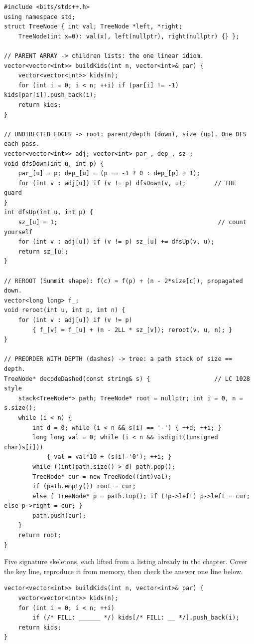 \begin{lstlisting}[caption={Chapter 4 code kit: build, root, and read two formats}, label={lst:c04-kit}]
#include <bits/stdc++.h>
using namespace std;
struct TreeNode { int val; TreeNode *left, *right;
    TreeNode(int x=0): val(x), left(nullptr), right(nullptr) {} };

// PARENT ARRAY -> children lists: the one linear idiom.
vector<vector<int>> buildKids(int n, vector<int>& par) {
    vector<vector<int>> kids(n);
    for (int i = 0; i < n; ++i) if (par[i] != -1) kids[par[i]].push_back(i);
    return kids;
}

// UNDIRECTED EDGES -> root: parent/depth (down), size (up). One DFS each pass.
vector<vector<int>> adj; vector<int> par_, dep_, sz_;
void dfsDown(int u, int p) {
    par_[u] = p; dep_[u] = (p == -1 ? 0 : dep_[p] + 1);
    for (int v : adj[u]) if (v != p) dfsDown(v, u);        // THE guard
}
int dfsUp(int u, int p) {
    sz_[u] = 1;                                             // count yourself
    for (int v : adj[u]) if (v != p) sz_[u] += dfsUp(v, u);
    return sz_[u];
}

// REROOT (Summit shape): f(c) = f(p) + (n - 2*size[c]), propagated down.
vector<long long> f_;
void reroot(int u, int p, int n) {
    for (int v : adj[u]) if (v != p)
        { f_[v] = f_[u] + (n - 2LL * sz_[v]); reroot(v, u, n); }
}

// PREORDER WITH DEPTH (dashes) -> tree: a path stack of size == depth.
TreeNode* decodeDashed(const string& s) {                  // LC 1028 style
    stack<TreeNode*> path; TreeNode* root = nullptr; int i = 0, n = s.size();
    while (i < n) {
        int d = 0; while (i < n && s[i] == '-') { ++d; ++i; }
        long long val = 0; while (i < n && isdigit((unsigned char)s[i]))
            { val = val*10 + (s[i]-'0'); ++i; }
        while ((int)path.size() > d) path.pop();
        TreeNode* cur = new TreeNode((int)val);
        if (path.empty()) root = cur;
        else { TreeNode* p = path.top(); if (!p->left) p->left = cur; else p->right = cur; }
        path.push(cur);
    }
    return root;
}
\end{lstlisting}


Five signature skeletons, each lifted from a listing already in the chapter. Cover the key
line, reproduce it from memory, then check the answer one line below.

\begin{lstlisting}[caption={Drill 1 -- parent array to children lists (from \coderef{c04-reps})}]
vector<vector<int>> buildKids(int n, vector<int>& par) {
    vector<vector<int>> kids(n);
    for (int i = 0; i < n; ++i)
        if (/* FILL: ______ */) kids[/* FILL: __ */].push_back(i);
    return kids;
}
\end{lstlisting}

